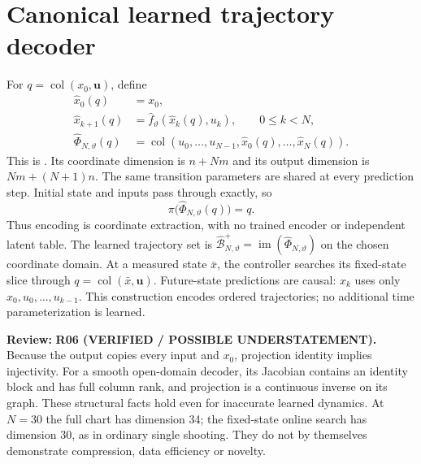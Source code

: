 \documentclass[11pt]{article}
\newcommand{\col}{\operatorname{col}}
\newcommand{\review}[1]{\par\noindent\textcolor{red!70!black}{\textbf{Review:} #1}\par}
\newcommand{\code}[1]{\texttt{\detokenize{#1}}}
\begin{document}
\section{Canonical learned trajectory decoder}
For $q=\col(x_0,\mathbf u)$, define
\begin{align}
\widehat x_0(q)&=x_0,\label{eq:initial}\\
\widehat x_{k+1}(q)&=\widehat f_\vartheta(\widehat x_k(q),u_k),\qquad 0\leq k<N,\label{eq:rollout}\\
\widehat\Phi_{N,\vartheta}(q)&=\col(u_0,\ldots,u_{N-1},\widehat x_0(q),\ldots,\widehat x_N(q)).\label{eq:decoder}
\end{align}
This is \code{CanonicalBehaviorDecoder}. Its coordinate dimension is $n+Nm$ and its output dimension is $Nm+(N+1)n$. The same transition parameters are shared at every prediction step. Initial state and inputs pass through exactly, so
\begin{equation}\label{eq:projection}
\pi\bigl(\widehat\Phi_{N,\vartheta}(q)\bigr)=q.
\end{equation}
Thus encoding is coordinate extraction, with no trained encoder or independent latent table. The learned trajectory set is $\widehat{\mathcal B}_{N,\vartheta}^+=\operatorname{im}(\widehat\Phi_{N,\vartheta})$ on the chosen coordinate domain. At a measured state $\bar x$, the controller searches its fixed-state slice through $q=\col(\bar x,\mathbf u)$. Future-state predictions are causal: $\widehat x_k$ uses only $x_0,u_0,\ldots,u_{k-1}$. This construction encodes ordered trajectories; no additional time parameterization is learned.
\review{\textbf{R06 (VERIFIED / POSSIBLE UNDERSTATEMENT).} Because the output copies every input and $x_0$, projection identity implies injectivity. For a smooth open-domain decoder, its Jacobian contains an identity block and has full column rank, and projection is a continuous inverse on its graph. These structural facts hold even for inaccurate learned dynamics. At $N=30$ the full chart has dimension 34; the fixed-state online search has dimension 30, as in ordinary single shooting. They do not by themselves demonstrate compression, data efficiency or novelty.}
\end{document}
